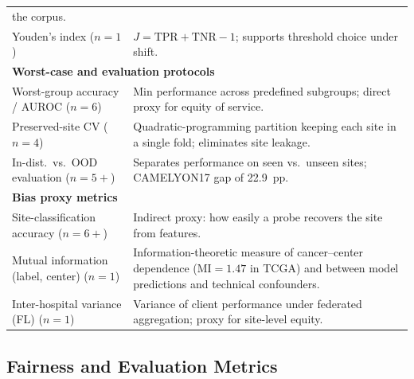 \begin{table}[htbp]
\begin{tabularx}{\linewidth}{@{}p{7.6cm} X@{}}
      the corpus. \\
    Youden's index ($n=1$) \citep{roschewitz2023automatic} &
      $J = \text{TPR} + \text{TNR} - 1$; supports threshold choice
      under shift. \\
    \midrule
    \multicolumn{2}{l}{\textbf{Worst-case and evaluation protocols}} \\
    Worst-group accuracy / AUROC ($n=6$) \citep{zong2023medfair,koh2021wilds,soltan2024challenges,huang2025knowledge,lin2025contrastive,xu2026spare} &
      Min performance across predefined subgroups; direct proxy for
      equity of service. \\
    Preserved-site CV ($n=4$) \citep{howard2021site,vaidya2024demographic,kheiri2025investigation} &
      Quadratic-programming partition keeping each site in a single
      fold; eliminates site leakage. \\
    In-dist.\ vs.\ OOD evaluation ($n=5+$) \citep{koh2021wilds,huang2025knowledge,zong2023medfair,asadiaghbolagh2024learning,komen2024batch} &
      Separates performance on seen vs.\ unseen sites;
      CAMELYON17 gap of 22.9~pp. \\
    \midrule
    \multicolumn{2}{l}{\textbf{Bias proxy metrics}} \\
    Site-classification accuracy ($n=6+$) \citep{dehkharghanian2023biased,bidgoli2022bias,mazaheri2023ranking,howard2021site,komen2024batch,kheiri2025investigation} &
      Indirect proxy: how easily a probe recovers the site from
      features. \\
    Mutual information (label, center) ($n=1$) \citep{kheiri2025investigation,lazard2022identifies} &
      Information-theoretic measure of cancer--center dependence
      ($\text{MI}=1.47$ in TCGA) and between model predictions and
      technical confounders. \\
    Inter-hospital variance (FL) ($n=1$) \citep{hosseini2023proportionally} &
      Variance of client performance under federated aggregation;
      proxy for site-level equity. \\
    \bottomrule
  \end{tabularx}
\end{table}

\subsection{Fairness and Evaluation Metrics}
\label{sec:results:metrics}

